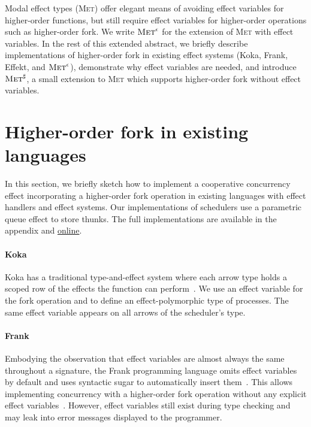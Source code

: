 \documentclass[sigplan, nonacm, natbib = false, review, screen]{acmart}
\newcommand{\Met}{\textsc{Met}\xspace}
\newcommand{\MetHO}{$\Met^\sharp$\xspace}
\newcommand{\MetVar}{$\Met^\epsilon$\xspace}
\begin{document}
Modal effect types (\Met) offer elegant means of avoiding effect variables for
higher-order functions, but still require effect variables for higher-order
operations such as higher-order fork.
%
We write \MetVar for the extension of \Met with effect variables.
%
In the rest of this extended abstract, we briefly describe
implementations of higher-order fork in existing effect systems (Koka,
Frank, Effekt, and \MetVar), demonstrate why effect variables are
needed, and introduce \MetHO, a small extension to \Met which supports
higher-order fork without effect variables.

\section{Higher-order fork in existing languages}\label{impl}

In this section, we briefly sketch how to implement a cooperative
concurrency effect incorporating a higher-order fork operation in
existing languages with effect handlers and effect systems.
%
Our implementations of schedulers use a parametric queue effect to store thunks.
%
The full implementations are available in the appendix and
\href{https://github.com/4y8/hope26}{online}.

\paragraph{Koka}
Koka has a traditional type-and-effect system where each arrow type holds a
scoped row of the effects the function can
perform~\cite{koka2014,scopedrows2005}.
%
We use an effect variable for the fork operation and to define an
effect-polymorphic type of processes. The same effect variable appears on all
arrows of the scheduler's type.

\paragraph{Frank}
Embodying the observation that effect variables are almost always the
same throughout a signature, the Frank programming language omits
effect variables by default and uses syntactic sugar to automatically
insert them~\cite{frank2020}.
%
This allows implementing concurrency with a higher-order fork
operation without any explicit effect
variables~\cite[Section~6]{frank2020}.
%
However, effect variables still exist during type checking and may
leak into error messages displayed to the programmer.
\end{document}
